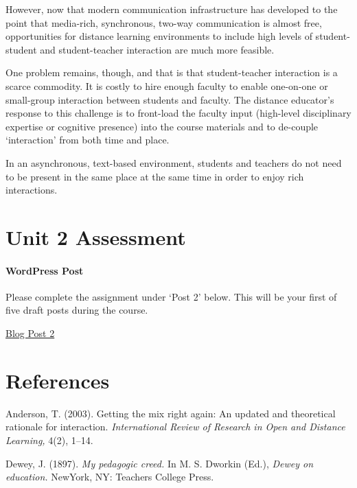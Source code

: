 \documentclass[
]{book}
\begin{document}
However, now that modern communication infrastructure has developed to the point that media-rich, synchronous, two-way communication is almost free, opportunities for distance learning environments to include high levels of student-student and student-teacher interaction are much more feasible.

One problem remains, though, and that is that student-teacher interaction is a scarce commodity. It is costly to hire enough faculty to enable one-on-one or small-group interaction between students and faculty. The distance educator's response to this challenge is to front-load the faculty input (high-level disciplinary expertise or cognitive presence) into the course materials and to de-couple `interaction' from both time and place.

In an asynchronous, text-based environment, students and teachers do not need to be present in the same place at the same time in order to enjoy rich interactions.

\hypertarget{unit-2-assessment}{%
\section*{Unit 2 Assessment}\label{unit-2-assessment}}

\begin{wp}
\hypertarget{wordpress-post}{%
\paragraph{WordPress Post}\label{wordpress-post}}

Please complete the assignment under `Post 2' below. This will be your
first of five draft posts during the course.

\href{https://ma-lead.github.io/ldrs663/assessments.html\#post-2}{Blog
Post 2}
\end{wp}

\hypertarget{references}{%
\section*{References}\label{references}}

Anderson, T. (2003). Getting the mix right again: An updated and theoretical rationale for interaction. \emph{International Review of Research in Open and Distance Learning,} 4(2), 1--14.

Dewey, J. (1897). \emph{My pedagogic creed.} In M. S. Dworkin (Ed.), \emph{Dewey on education.} NewYork, NY: Teachers College Press.
\end{document}
